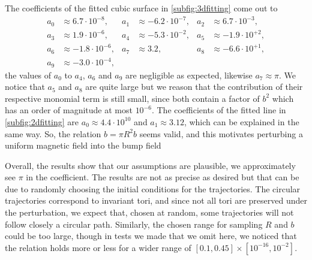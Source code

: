 The coefficients of the fitted cubic surface in \cref{subfig:3dfitting} come out to
\begin{align*}
a_0&\approx  6.7\cdot10^{-8},	&
a_1&\approx -6.2\cdot10^{-7},	&
a_2&\approx  6.7\cdot10^{-3},\\
a_3&\approx  1.9\cdot10^{-6},	&
a_4&\approx -5.3\cdot10^{-2},	&
a_5&\approx -1.9\cdot10^{+2},\\
a_6&\approx -1.8\cdot10^{-6},	&
a_7&\approx  3.2,				&
a_8&\approx  -6.6\cdot10^{+1},\\
a_9&\approx  -3.0\cdot10^{-4},
\end{align*} 
the values of $a_0$ to $a_4$, $a_6$ and $a_9$ are negligible as expected, likewise $a_7\approx\pi$. We notice that $a_5$ and $a_8$ are quite large but we reason that the contribution of their respective monomial term is still small, since both contain a factor of $b^2$ which has an order of magnitude at most $10^{-6}$. The coefficients of the fitted line in \cref{subfig:2dfitting} are $a_0\approx 4.4\cdot10^{10}$ and $a_1\approx3.12$, which can be explained in the same way. So, the relation $\hat b =\pi R^2b$ seems valid, and this motivates perturbing a uniform magnetic field into the bump field

Overall, the results show that our assumptions are plausible, we approximately see $\pi$ in the coefficient. The results are not as precise as desired but that can be due to randomly choosing the initial conditions for the trajectories. The circular trajectories correspond to invariant tori, and since not all tori are preserved under the perturbation, we expect that, chosen at random, some trajectories will not follow closely a circular path. Similarly, the chosen range for sampling $R$ and $b$ could be too large, though in tests we made that we omit here, we noticed that the relation holds more or less for a wider range of $[0.1, 0.45]\times[10^{-16}, 10^{-2}]$.


